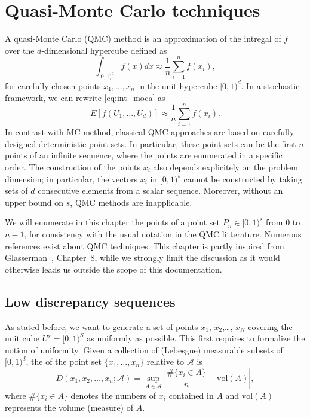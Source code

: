 \chapter{Quasi-Monte Carlo techniques}

A quasi-Monte Carlo
(QMC) method is an approximation of
the intregal of $f$ over the $d$-dimensional hypercube defined as
\begin{equation}
\int_{[0,1)^d} f(x) dx \approx \frac{1}{n} \sum_{i=1}^{n} f(x_i),
\label{eq:int_moca}
\end{equation}
for carefully chosen points $x_1,\ldots,x_n$ in the unit hypercube
$[0,1)^d$.
In a stochastic framework, we can rewrite \eqref{eq:int_moca} as
\[
E[f(U_1,\ldots,U_d)] \approx \frac{1}{n} \sum_{i=1}^{n} f(x_i).
\]
In contrast with MC method, classical QMC approaches are based on
carefully designed deterministic point sets.
In particular, these point sets can be the first $n$ points of an
infinite sequence, where the points are enumerated in a specific
order.
The construction of the points $x_i$ also depends explicitely on the
problem dimension; in particular, the vectors $x_i$ in $[0,1)^s$
cannot be constructed by taking sets of $d$ consecutive elements from
a scalar sequence.
Moreover, without an upper bound on $s$, QMC methods are inapplicable.

We will enumerate in this chapter the points of a point set $P_n \in
[0,1)^s$ from 0 to $n-1$, for consistency with the usual notation in
the QMC litterature.
Numerous references exist about QMC techniques.
This chapter is partly inspired from Glasserman~\cite{Glas04},
Chapter~8, while we strongly limit the discussion as it would
otherwise leads us outside the scope of this documentation.

\section{Low discrepancy sequences}

As stated before, we want to generate a set of points $x_1$,
$x_2$,\ldots, $x_N$ covering the unit cube $U^s = [0,1)^S$ as
uniformly as possible.
This first requires to formalize the notion of uniformity.
Given a collection of (Lebesgue) measurable subsets of $[0,1)^d$, the
 of the point set $\lbrace x_1, \ldots, x_n \rbrace$
relative to $\mathcal{A}$ is
\[
D(x_1, x_2,\ldots, x_n; \mathcal{A}) = \sup_{A \in \mathcal{A}} \left|
  \frac{\# \lbrace x_i \in A \rbrace}{n} - \mbox{vol}(A) \right|,
\]
where $\# \lbrace x_i \in A \rbrace$ denotes the numbers of $x_i$
contained in $A$ and $\mbox{vol}(A)$ represents the volume (measure)
of $A$.

